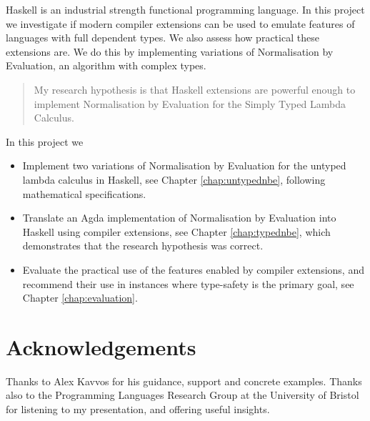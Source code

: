 \documentclass[ %
                    author={Lucas O'Dowd-Jones},
                supervisor={Dr. Alex Kavvos},
                    degree={MEng},
                     title={Variations on Normalisation by Evaluation in Haskell},
                  subtitle={},
                      type={programming languages},
                      year={2021}]{dissertation}
\begin{document}
Haskell is an industrial strength functional programming language. In this project we investigate if modern compiler extensions can be used to emulate features of languages with full dependent types. We also assess how practical these extensions are. We do this by implementing variations of Normalisation by Evaluation, an algorithm with complex types.

\noindent
\begin{quote}
      My research hypothesis is that Haskell extensions are powerful enough to implement Normalisation by Evaluation for the Simply Typed Lambda Calculus. 
\end{quote}

\noindent
In this project we

\begin{itemize}
\item Implement two variations of Normalisation by Evaluation for the untyped lambda calculus in  Haskell, see Chapter \ref{chap:untypednbe}, following mathematical specifications.
\item Translate an Agda implementation of Normalisation by Evaluation into Haskell using compiler extensions, see Chapter \ref{chap:typednbe}, which demonstrates that the research hypothesis was correct.
\item Evaluate the practical use of the features enabled by compiler extensions, and recommend their use in instances where type-safety is the primary goal, see Chapter \ref{chap:evaluation}.
\end{itemize}



\chapter*{Acknowledgements}


\noindent
Thanks to Alex Kavvos for his guidance, support and concrete examples.
\noindent
Thanks also to the Programming Languages Research Group at the University of Bristol for listening to my presentation, and offering useful insights.


%
\end{document}
